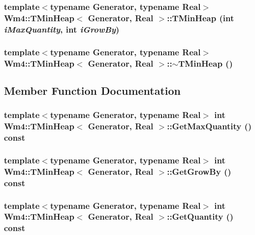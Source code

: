 \subsubsection{\setlength{\rightskip}{0pt plus 5cm}template$<$typename Generator, typename Real$>$ {\bf Wm4::TMin\-Heap}$<$ Generator, Real $>$::{\bf TMin\-Heap} (int {\em i\-Max\-Quantity}, int {\em i\-Grow\-By})}\label{classWm4_1_1TMinHeap_8373e9b14f2266640e96986cdec5f68c}


\subsubsection{\setlength{\rightskip}{0pt plus 5cm}template$<$typename Generator, typename Real$>$ {\bf Wm4::TMin\-Heap}$<$ Generator, Real $>$::$\sim${\bf TMin\-Heap} ()}\label{classWm4_1_1TMinHeap_79cca676827e6fda7d450aa66308fb31}




\subsection{Member Function Documentation}
\subsubsection{\setlength{\rightskip}{0pt plus 5cm}template$<$typename Generator, typename Real$>$ int {\bf Wm4::TMin\-Heap}$<$ Generator, Real $>$::Get\-Max\-Quantity () const}\label{classWm4_1_1TMinHeap_66b539704c300316ba16635ba9741560}


\subsubsection{\setlength{\rightskip}{0pt plus 5cm}template$<$typename Generator, typename Real$>$ int {\bf Wm4::TMin\-Heap}$<$ Generator, Real $>$::Get\-Grow\-By () const}\label{classWm4_1_1TMinHeap_9f16aa7f7ba00f3455951ce8892ff8ad}


\subsubsection{\setlength{\rightskip}{0pt plus 5cm}template$<$typename Generator, typename Real$>$ int {\bf Wm4::TMin\-Heap}$<$ Generator, Real $>$::Get\-Quantity () const}\label{classWm4_1_1TMinHeap_ca60c44af3067f82fe92ead0af38e880}


